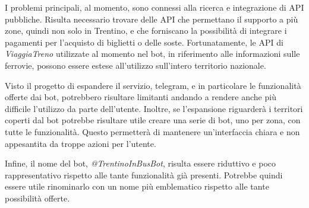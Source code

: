 I problemi principali, al momento, sono connessi alla ricerca e integrazione di API pubbliche. Risulta necessario trovare delle API che permettano il supporto a più zone, quindi non solo in Trentino, e che forniscano la possibilità di integrare i pagamenti per l'acquisto di biglietti o delle soste. Fortunatamente, le API di \textit{ViaggiaTreno} utilizzate al momento nel bot, in riferimento alle informazioni sulle ferrovie, possono essere estese all'utilizzo sull'intero territorio nazionale. 

Visto il progetto di espandere il servizio, telegram, e in particolare le funzionalità offerte dai bot, potrebbero risultare limitanti andando a rendere anche più difficile l'utilizzo da parte dell'utente. Inoltre, se l'espansione riguarderà i territori coperti dal bot potrebbe risultare utile creare una serie di bot, uno per zona, con tutte le funzionalità. Questo permetterà di mantenere un'interfaccia chiara e non appesantita da troppe azioni per l'utente. 

Infine, il nome del bot, \textit{@TrentinoInBusBot}, risulta essere riduttivo e poco rappresentativo rispetto alle tante funzionalità già presenti. Potrebbe quindi essere utile rinominarlo con un nome più emblematico rispetto alle tante possibilità offerte. 


